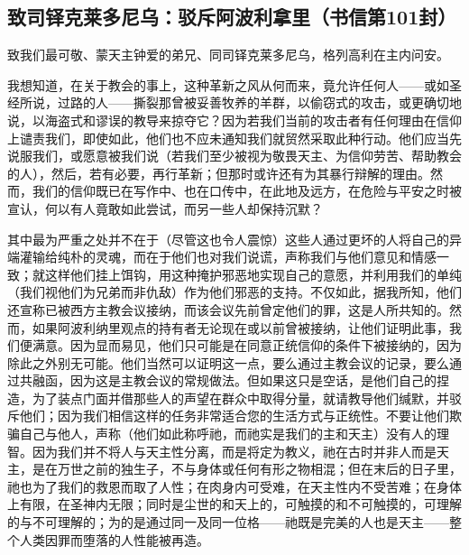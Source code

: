 \subsection{致司铎克莱多尼乌：驳斥阿波利拿里（书信第101封）}

致我们最可敬、蒙天主钟爱的弟兄、同司铎克莱多尼乌，格列高利在主内问安。\par

我想知道，在关于教会的事上，这种革新之风从何而来，竟允许任何人——或如圣经所说，过路的人——撕裂那曾被妥善牧养的羊群，以偷窃式的攻击，或更确切地说，以海盗式和谬误的教导来掠夺它？因为若我们当前的攻击者有任何理由在信仰上谴责我们，即使如此，他们也不应未通知我们就贸然采取此种行动。他们应当先说服我们，或愿意被我们说（若我们至少被视为敬畏天主、为信仰劳苦、帮助教会的人），然后，若有必要，再行革新；但那时或许还有为其暴行辩解的理由。然而，我们的信仰既已在写作中、也在口传中，在此地及远方，在危险与平安之时被宣认，何以有人竟敢如此尝试，而另一些人却保持沉默？\par

其中最为严重之处并不在于（尽管这也令人震惊）这些人通过更坏的人将自己的异端灌输给纯朴的灵魂，而在于他们也对我们说谎，声称我们与他们意见和情感一致；就这样他们挂上饵钩，用这种掩护邪恶地实现自己的意愿，并利用我们的单纯（我们视他们为兄弟而非仇敌）作为他们邪恶的支持。不仅如此，据我所知，他们还宣称已被西方主教会议接纳，而该会议先前曾定他们的罪，这是人所共知的。然而，如果阿波利纳里观点的持有者无论现在或以前曾被接纳，让他们证明此事，我们便满意。因为显而易见，他们只可能是在同意正统信仰的条件下被接纳的，因为除此之外别无可能。他们当然可以证明这一点，要么通过主教会议的记录，要么通过共融函，因为这是主教会议的常规做法。但如果这只是空话，是他们自己的捏造，为了装点门面并借那些人的声望在群众中取得分量，就请教导他们缄默，并驳斥他们；因为我们相信这样的任务非常适合您的生活方式与正统性。不要让他们欺骗自己与他人，声称（他们如此称呼祂，而祂实是我们的主和天主）没有人的理智。因为我们并不将人与天主性分离，而是将定为教义，祂在古时并非人而是天主，是在万世之前的独生子，不与身体或任何有形之物相混；但在末后的日子里，祂也为了我们的救恩而取了人性；在肉身内可受难，在天主性内不受苦难；在身体上有限，在圣神内无限；同时是尘世的和天上的，可触摸的和不可触摸的，可理解的与不可理解的；为的是通过同一及同一位格——祂既是完美的人也是天主——整个人类因罪而堕落的人性能被再造。\par


